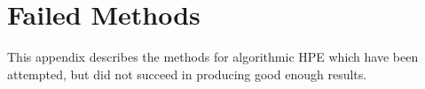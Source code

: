 \chapter{Failed Methods}
\label{app: failed methods}


This appendix describes the methods for algorithmic HPE which have been attempted, but did not succeed in producing good enough results.
